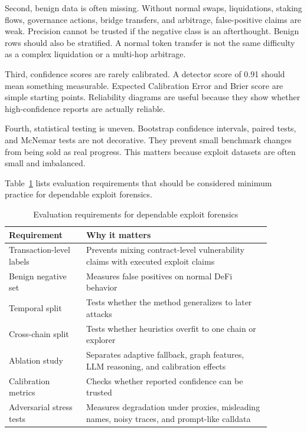 \documentclass[conference]{IEEEtran}
\begin{document}
Second, benign data is often missing. Without normal swaps, liquidations, staking flows, governance actions, bridge transfers, and arbitrage, false-positive claims are weak. Precision cannot be trusted if the negative class is an afterthought. Benign rows should also be stratified. A normal token transfer is not the same difficulty as a complex liquidation or a multi-hop arbitrage.

Third, confidence scores are rarely calibrated. A detector score of 0.91 should mean something measurable. Expected Calibration Error and Brier score are simple starting points. Reliability diagrams are useful because they show whether high-confidence reports are actually reliable.

Fourth, statistical testing is uneven. Bootstrap confidence intervals, paired tests, and McNemar tests are not decorative. They prevent small benchmark changes from being sold as real progress. This matters because exploit datasets are often small and imbalanced.

Table~\ref{tab:evaluation} lists evaluation requirements that should be considered minimum practice for dependable exploit forensics.

\begin{table}[t]
\caption{Evaluation requirements for dependable exploit forensics}
\label{tab:evaluation}
\centering
\small
\begin{tabular}{p{0.26\linewidth}p{0.62\linewidth}}
\toprule
Requirement & Why it matters \\
\midrule
Transaction-level labels & Prevents mixing contract-level vulnerability claims with executed exploit claims \\
Benign negative set & Measures false positives on normal DeFi behavior \\
Temporal split & Tests whether the method generalizes to later attacks \\
Cross-chain split & Tests whether heuristics overfit to one chain or explorer \\
Ablation study & Separates adaptive fallback, graph features, LLM reasoning, and calibration effects \\
Calibration metrics & Checks whether reported confidence can be trusted \\
Adversarial stress tests & Measures degradation under proxies, misleading names, noisy traces, and prompt-like calldata \\
\bottomrule
\end{tabular}
\end{table}
\end{document}
